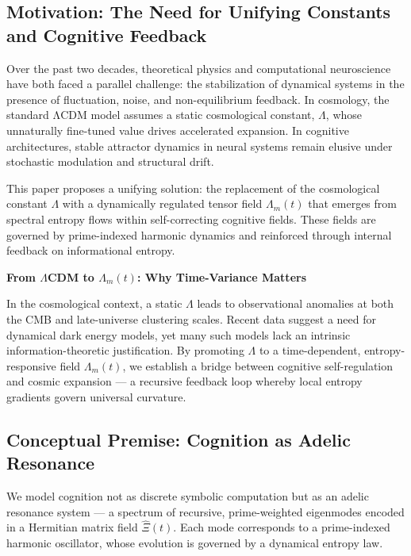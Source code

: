 \documentclass[12pt]{article}
\theoremstyle{plain}
\begin{document}
\subsection{Motivation: The Need for Unifying Constants and Cognitive Feedback}

Over the past two decades, theoretical physics and computational neuroscience have both faced a parallel challenge: the stabilization of dynamical systems in the presence of fluctuation, noise, and non-equilibrium feedback. In cosmology, the standard ΛCDM model assumes a static cosmological constant, $\Lambda$, whose unnaturally fine-tuned value drives accelerated expansion. In cognitive architectures, stable attractor dynamics in neural systems remain elusive under stochastic modulation and structural drift.

This paper proposes a unifying solution: the replacement of the cosmological constant $\Lambda$ with a dynamically regulated tensor field $\Lambda_m(t)$ that emerges from spectral entropy flows within self-correcting cognitive fields. These fields are governed by prime-indexed harmonic dynamics and reinforced through internal feedback on informational entropy.

\vspace{1em}

\noindent\textbf{From $\Lambda$CDM to $\Lambda_m(t)$: Why Time-Variance Matters}

In the cosmological context, a static $\Lambda$ leads to observational anomalies at both the CMB and late-universe clustering scales. Recent data suggest a need for dynamical dark energy models, yet many such models lack an intrinsic information-theoretic justification. By promoting $\Lambda$ to a time-dependent, entropy-responsive field $\Lambda_m(t)$, we establish a bridge between cognitive self-regulation and cosmic expansion — a recursive feedback loop whereby local entropy gradients govern universal curvature.

\subsection{Conceptual Premise: Cognition as Adelic Resonance}

We model cognition not as discrete symbolic computation but as an adelic resonance system — a spectrum of recursive, prime-weighted eigenmodes encoded in a Hermitian matrix field $\hat{\Xi}(t)$. Each mode corresponds to a prime-indexed harmonic oscillator, whose evolution is governed by a dynamical entropy law. 
\end{document}
